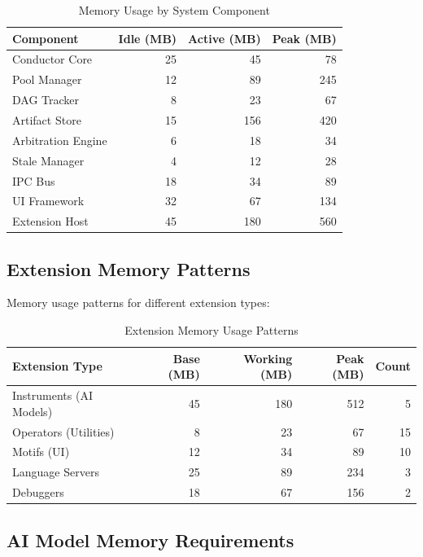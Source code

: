 \begin{table}[ht]
\centering
\caption{Memory Usage by System Component}
\label{tab:component-memory}
\begin{tabular}{@{}lrrr@{}}
\toprule
\textbf{Component} & \textbf{Idle (MB)} & \textbf{Active (MB)} & \textbf{Peak (MB)} \\
\midrule
Conductor Core & 25 & 45 & 78 \\
Pool Manager & 12 & 89 & 245 \\
DAG Tracker & 8 & 23 & 67 \\
Artifact Store & 15 & 156 & 420 \\
Arbitration Engine & 6 & 18 & 34 \\
Stale Manager & 4 & 12 & 28 \\
IPC Bus & 18 & 34 & 89 \\
UI Framework & 32 & 67 & 134 \\
Extension Host & 45 & 180 & 560 \\
\bottomrule
\end{tabular}
\end{table}

\subsection*{Extension Memory Patterns}

Memory usage patterns for different extension types:

\begin{table}[ht]
\centering
\caption{Extension Memory Usage Patterns}
\label{tab:extension-memory}
\begin{tabular}{@{}lrrrr@{}}
\toprule
\textbf{Extension Type} & \textbf{Base (MB)} & \textbf{Working (MB)} & \textbf{Peak (MB)} & \textbf{Count} \\
\midrule
Instruments (AI Models) & 45 & 180 & 512 & 5 \\
Operators (Utilities) & 8 & 23 & 67 & 15 \\
Motifs (UI) & 12 & 34 & 89 & 10 \\
Language Servers & 25 & 89 & 234 & 3 \\
Debuggers & 18 & 67 & 156 & 2 \\
\bottomrule
\end{tabular}
\end{table}

\subsection*{AI Model Memory Requirements}

